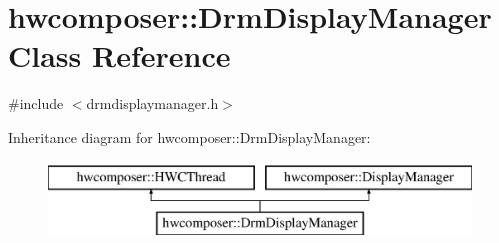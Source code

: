 \hypertarget{classhwcomposer_1_1DrmDisplayManager}{}\section{hwcomposer\+:\+:Drm\+Display\+Manager Class Reference}
\label{classhwcomposer_1_1DrmDisplayManager}


{\ttfamily \#include $<$drmdisplaymanager.\+h$>$}

Inheritance diagram for hwcomposer\+:\+:Drm\+Display\+Manager\+:\begin{figure}[H]
\begin{center}
\leavevmode
\includegraphics[height=2.000000cm]{classhwcomposer_1_1DrmDisplayManager}
\end{center}
\end{figure}

